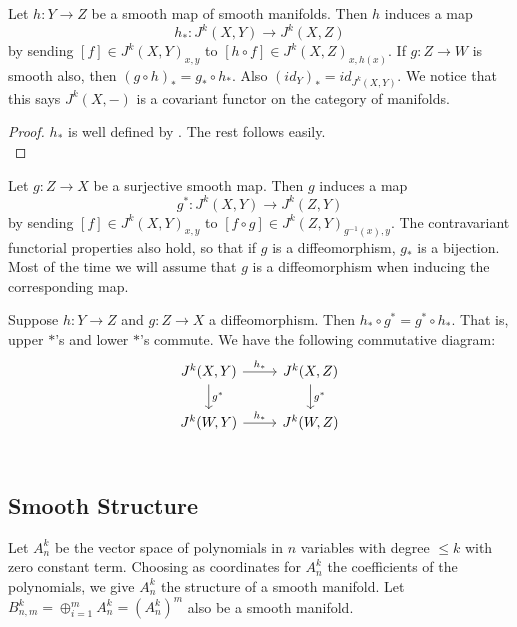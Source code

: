 \documentclass[12pt]{article}
\begin{document}
\begin{proposition}
    Let $h: Y \to Z$ be a smooth map of smooth manifolds. Then $h$ induces a map 
    $$h_*: J^k(X, Y) \to J^k(X, Z)$$
    by sending $[f] \in J^k(X, Y)_{x, y}$ to $[h\circ f] \in J^k(X, Z)_{x, h(x)}$. If $g: Z\to W$ is smooth also, then $(g\circ h)_* = g_* \circ h_*$. Also $(id_Y)_* = id_{J^k(X, Y)}$. We notice that this says $J^k(X, -)$ is a covariant functor on the category of manifolds.
\end{proposition}
\begin{proof}
    $h_*$ is well defined by . The rest follows easily. \\
\end{proof}

\begin{proposition}
    Let $g:Z \to X$ be a surjective smooth map. Then $g$ induces a map 
    $$g^*: J^k(X, Y) \to J^k(Z, Y)$$
    by sending $[f] \in J^k(X, Y)_{x, y}$ to $[f\circ g] \in J^k(Z, Y)_{g^{-1}(x), y}$. The contravariant functorial properties also hold, so that if $g$ is a diffeomorphism, $g_*$ is a bijection. Most of the time we will assume that $g$ is a diffeomorphism when inducing the corresponding map. \\
\end{proposition}


\begin{remark} \label{commuting stars}
    Suppose $h: Y \to Z$ and $g: Z \to X$ a diffeomorphism. Then $h_* \circ g^* = g^* \circ h_*$. That is, upper $*$'s and lower $*$'s commute. We have the following commutative diagram: 
    $$
    \begin{tikzcd}
        J^k(X, Y) \arrow[r, "h_*"] \arrow[d, "g^*"] & J^k(X, Z) \arrow[d, "g^*"] \\ 
        J^k(W, Y) \arrow[r, "h_*"] & J^k(W, Z) \\ 
    \end{tikzcd}
    $$
\end{remark}


\subsection{Smooth Structure}
Let $A_n^k$ be the vector space of polynomials in $n$ variables with degree $\leq k$ with zero constant term. Choosing as coordinates for $A_n^k$ the coefficients of the polynomials, we give $A_n^k$ the structure of a smooth manifold. Let $B_{n, m}^k = \oplus_{i=1}^m A_n^k = (A_n^k)^m$ also be a smooth manifold. \\
\end{document}
